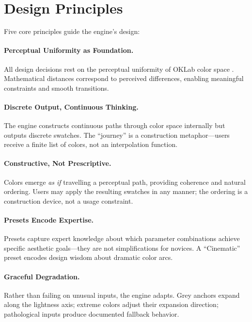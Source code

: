 \section{Design Principles}
\label{sec:design-principles}

Five core principles guide the engine's design:

\paragraph{Perceptual Uniformity as Foundation.}
All design decisions rest on the perceptual uniformity of OKLab color space \cite{ottosson2020}. Mathematical distances correspond to perceived differences, enabling meaningful constraints and smooth transitions.

\paragraph{Discrete Output, Continuous Thinking.}
The engine constructs continuous paths through color space internally but outputs discrete swatches. The ``journey'' is a construction metaphor---users receive a finite list of colors, not an interpolation function.

\paragraph{Constructive, Not Prescriptive.}
Colors emerge \emph{as if} travelling a perceptual path, providing coherence and natural ordering. Users may apply the resulting swatches in any manner; the ordering is a construction device, not a usage constraint.

\paragraph{Presets Encode Expertise.}
Presets capture expert knowledge about which parameter combinations achieve specific aesthetic goals---they are not simplifications for novices. A ``Cinematic'' preset encodes design wisdom about dramatic color arcs.

\paragraph{Graceful Degradation.}
Rather than failing on unusual inputs, the engine adapts. Grey anchors expand along the lightness axis; extreme colors adjust their expansion direction; pathological inputs produce documented fallback behavior.

